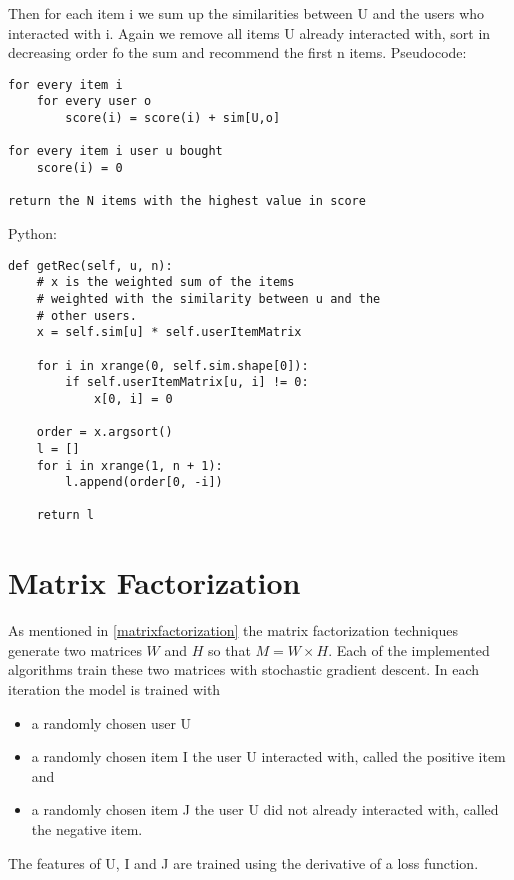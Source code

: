 Then for each item i we sum up the similarities between U and the
users who interacted with i. Again we remove all items U already interacted
with, sort in decreasing order fo the sum and recommend the first
n items.
Pseudocode:
\begin{lstlisting}
for every item i 
    for every user o
        score(i) = score(i) + sim[U,o]

for every item i user u bought
    score(i) = 0

return the N items with the highest value in score
\end{lstlisting}
Python:
\begin{lstlisting}
def getRec(self, u, n):
    # x is the weighted sum of the items
    # weighted with the similarity between u and the
    # other users.
    x = self.sim[u] * self.userItemMatrix

    for i in xrange(0, self.sim.shape[0]):
        if self.userItemMatrix[u, i] != 0:
            x[0, i] = 0

    order = x.argsort()
    l = []
    for i in xrange(1, n + 1):
        l.append(order[0, -i])

    return l
\end{lstlisting}

\section{Matrix Factorization}
As mentioned in \ref{matrixfactorization} the matrix factorization
techniques generate two matrices \(W\) and \(H\) so that \(M = W \times H\).
Each of the implemented algorithms train these two matrices with stochastic
gradient descent. In each iteration the model is trained with
\begin{itemize} 
    \item a randomly chosen user U
    \item a randomly chosen item I the user U interacted with, called the positive item and 
    \item a randomly chosen item J the user U did not already interacted with, 
        called the negative item.
\end{itemize}
The features of U, I and J are trained using the derivative
of a loss function.

